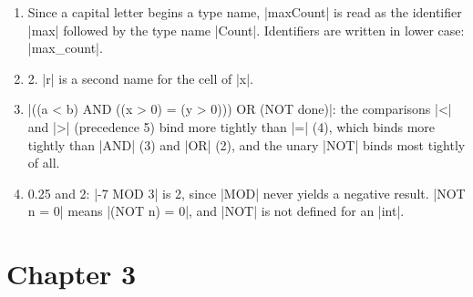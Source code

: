 \begin{enumerate}
  3; this is assigned to \code|b|, and the value of \code|b| is then
  assigned to \code|a|.
\item Since a capital letter begins a type name, \code|maxCount| is read
  as the identifier \code|max| followed by the type name \code|Count|.
  Identifiers are written in lower case: \code|max_count|.
\item 2. \code|r| is a second name for the cell of \code|x|.
\item \code|((a < b) AND ((x > 0) = (y > 0))) OR (NOT done)|: the
  comparisons \code|<| and \code|>| (precedence 5) bind more tightly than
  \code|=| (4), which binds more tightly than \code|AND| (3) and
  \code|OR| (2), and the unary \code|NOT| binds most tightly of all.
\item 0.25 and 2: \code|-7 MOD 3| is 2, since \code|MOD| never yields a
  negative result. \code|NOT n = 0| means \code|(NOT n) = 0|, and
  \code|NOT| is not defined for an \code|int|.
\end{enumerate}

\section*{Chapter 3}\label{ans-ch3}

